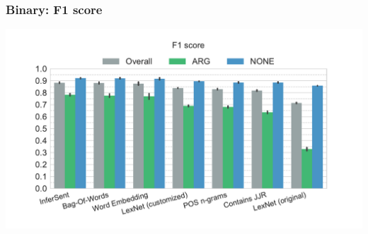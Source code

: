\documentclass[11pt,aspectratio=169,usenames,dvipsnames]{beamer}
\begin{document}
    \begin{frame}[t]
        \frametitle{Binary: F1 score}
        \centerline{\includegraphics[scale=0.45,trim={0 0 0 0.5cm},clip]{images/experiments/p-f1-True}}
    \end{frame}
\end{document}

